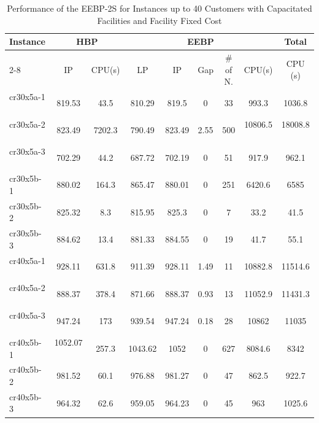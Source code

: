 \documentclass[graybox]{./styles/svmult}
\begin{document}
\begin{table}[ht]
\caption{Performance of the EEBP-2S for Instances up to 40 Customers with Capacitated Facilities and Facility Fixed Cost}\label{gr5-fc}
\begin {tabular}[t]{|l|c|c|c|c|c|c|c|c|}  
\hline
Instance & \multicolumn{2}{|c|}{HBP} & \multicolumn{5}{|c|}{EEBP}& Total \\\cline{2-8}
\mbox{} & IP & CPU(s) & LP & IP & Gap & \# of N. & CPU(s) & CPU (s) \\\hline
cr30x5a-1  \ \ &	819.53	&	43.5	&	810.29	&	819.5	&	0	&	33	&	993.3	&	1036.8	     \\
cr30x5a-2 \ \ &	823.49	&	7202.3	&	790.49	&	823.49	&	2.55	&	500	&	10806.5 \ \	& 18008.8   \ \ \\
cr30x5a-3 \ \ &	702.29	&	44.2	&	687.72	&	702.19	&	0	&	51	&	917.9	&	962.1	\\
cr30x5b-1 \ \ &	880.02	&	164.3	&	865.47	&	880.01	&	0	&	251	&	6420.6	&	6585	\\
cr30x5b-2  \ \ &	825.32	&	8.3	&	815.95	&	825.3	&	0	&	7	&	33.2	&	41.5	\\
cr30x5b-3 \ \ &	884.62	&	13.4	&	881.33	&	884.55	&	0	&	19	&	41.7	&	55.1	\\
cr40x5a-1 \ \ &	928.11	&	631.8	&	911.39	&	928.11	&	1.49	&	11	&	10882.8 &	11514.6	\\
cr40x5a-2 \ \ &	888.37	&	378.4	&	871.66	&	888.37	&	0.93	&	13	&	11052.9 &	11431.3	\\
cr40x5a-3 \ \ &	947.24	&	173	&	939.54	&	947.24	&	0.18	&	28	&	10862 &	11035	\\
cr40x5b-1 \ \ &	1052.07 \ \	&	257.3	&	1043.62	&	1052	&	0	&	627	&	8084.6	&	8342	\\
cr40x5b-2 \ \ &	981.52	&	60.1	&	976.88	&	981.27	&	0	&	47	&	862.5	&	922.7	\\
cr40x5b-3 \ \ &	964.32	&	62.6	&	959.05	&	964.23	&	0	&	45	&	963	&	1025.6	\\
\hline
\end{tabular}
\end{table} 
\end{document}
